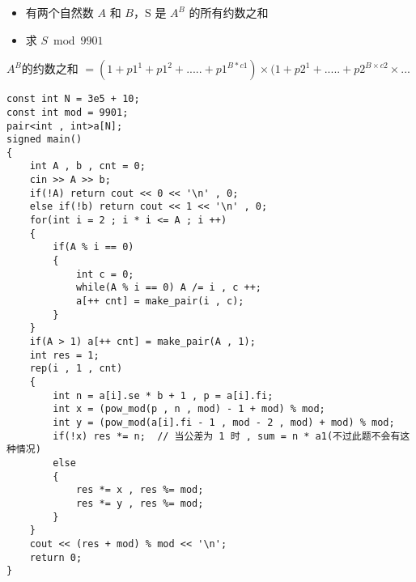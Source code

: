 \documentclass[E:/GsjzTle/main/main.tex]{subfiles}
\begin{document}
\begin{itemize}
\item
  有两个自然数 \(A\) 和 \(B\)，S 是 \(A^B\) 的所有约数之和
\item
  求 \(S\bmod9901\)
\end{itemize}

\(A^B\)的约数之和
\(= (1+p1^1+p1^2+.....+p1^{B*c1})×(1+p2^1+.....+p2^{B×c2} × ...\)

\begin{lstlisting}
const int N = 3e5 + 10;
const int mod = 9901;
pair<int , int>a[N];
signed main()
{
	int A , b , cnt = 0;
	cin >> A >> b;
	if(!A) return cout << 0 << '\n' , 0;
	else if(!b) return cout << 1 << '\n' , 0;
	for(int i = 2 ; i * i <= A ; i ++)
	{
		if(A % i == 0)
		{
			int c = 0;
			while(A % i == 0) A /= i , c ++;
			a[++ cnt] = make_pair(i , c);
		}
	}
	if(A > 1) a[++ cnt] = make_pair(A , 1);
	int res = 1;
	rep(i , 1 , cnt)
	{
		int n = a[i].se * b + 1 , p = a[i].fi;
		int x = (pow_mod(p , n , mod) - 1 + mod) % mod;
		int y = (pow_mod(a[i].fi - 1 , mod - 2 , mod) + mod) % mod;
		if(!x) res *= n;  // 当公差为 1 时 , sum = n * a1(不过此题不会有这种情况)
		else
		{
			res *= x , res %= mod;
			res *= y , res %= mod;
		}
	}
	cout << (res + mod) % mod << '\n';
	return 0;
}
\end{lstlisting}
\end{document}
